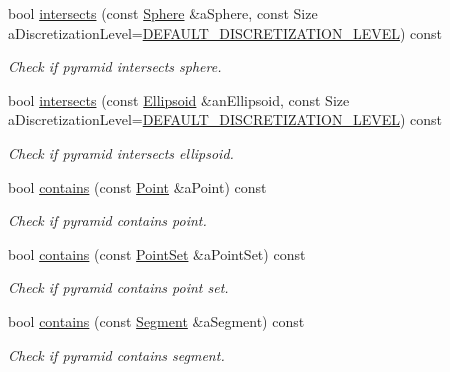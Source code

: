 \begin{DoxyCompactItemize}
bool \hyperlink{classostk_1_1math_1_1geom_1_1d3_1_1objects_1_1_pyramid_afec0e69f5caed5b0b676d70f414142dd}{intersects} (const \hyperlink{classostk_1_1math_1_1geom_1_1d3_1_1objects_1_1_sphere}{Sphere} \&a\+Sphere, const Size a\+Discretization\+Level=\hyperlink{_pyramid_8hpp_a3eb9931e85ba4c9718113211e549e91d}{D\+E\+F\+A\+U\+L\+T\+\_\+\+D\+I\+S\+C\+R\+E\+T\+I\+Z\+A\+T\+I\+O\+N\+\_\+\+L\+E\+V\+EL}) const
\begin{DoxyCompactList}\small\item\em Check if pyramid intersects sphere. \end{DoxyCompactList}\item 
bool \hyperlink{classostk_1_1math_1_1geom_1_1d3_1_1objects_1_1_pyramid_a807b60d75b73a97647cb41866c31e672}{intersects} (const \hyperlink{classostk_1_1math_1_1geom_1_1d3_1_1objects_1_1_ellipsoid}{Ellipsoid} \&an\+Ellipsoid, const Size a\+Discretization\+Level=\hyperlink{_pyramid_8hpp_a3eb9931e85ba4c9718113211e549e91d}{D\+E\+F\+A\+U\+L\+T\+\_\+\+D\+I\+S\+C\+R\+E\+T\+I\+Z\+A\+T\+I\+O\+N\+\_\+\+L\+E\+V\+EL}) const
\begin{DoxyCompactList}\small\item\em Check if pyramid intersects ellipsoid. \end{DoxyCompactList}\item 
bool \hyperlink{classostk_1_1math_1_1geom_1_1d3_1_1objects_1_1_pyramid_a7f476c37cc3f014bdc24e7fa4f2da743}{contains} (const \hyperlink{classostk_1_1math_1_1geom_1_1d3_1_1objects_1_1_point}{Point} \&a\+Point) const
\begin{DoxyCompactList}\small\item\em Check if pyramid contains point. \end{DoxyCompactList}\item 
bool \hyperlink{classostk_1_1math_1_1geom_1_1d3_1_1objects_1_1_pyramid_a4eebfb0cbd8d60ffce7db9b61b550e63}{contains} (const \hyperlink{classostk_1_1math_1_1geom_1_1d3_1_1objects_1_1_point_set}{Point\+Set} \&a\+Point\+Set) const
\begin{DoxyCompactList}\small\item\em Check if pyramid contains point set. \end{DoxyCompactList}\item 
bool \hyperlink{classostk_1_1math_1_1geom_1_1d3_1_1objects_1_1_pyramid_a7c7d10a2e8fb4a1b23a3b55a5156e588}{contains} (const \hyperlink{classostk_1_1math_1_1geom_1_1d3_1_1objects_1_1_segment}{Segment} \&a\+Segment) const
\begin{DoxyCompactList}\small\item\em Check if pyramid contains segment. \end{DoxyCompactList}\item 

\end{DoxyCompactItemize}
